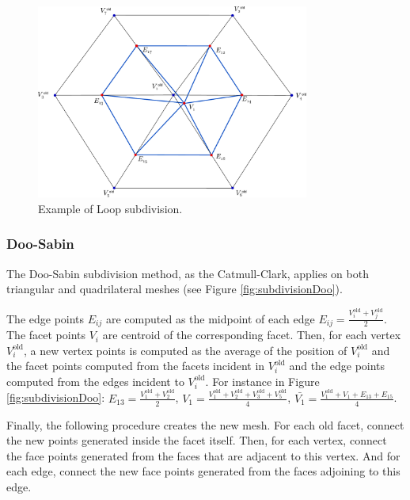 \begin{figure}
\begin{center}
\centering
  \includegraphics[width=0.8\textwidth]{./img/subdivisionLoop}
 \caption{Example of Loop subdivision.}
 \label{fig:subdivisionLoop}
\end{center}
\end{figure}

\subsubsection{Doo-Sabin}

The Doo-Sabin subdivision method, as the Catmull-Clark, applies on both triangular and quadrilateral meshes (see Figure \ref{fig:subdivisionDoo}).

The edge points $E_{ij}$ are computed as the midpoint of each edge $E_{ij} = \frac{V_i^{\text{old}} + V_j^{\text{old}}}{2}$. 
The facet points $V_i$ are centroid of the corresponding facet. 
Then, for each vertex $V_i^{\text{old}}$, a new vertex points is computed as the average of the position of $V_i^{\text{old}}$ and the facet points computed from the facets incident in $V_i^{\text{old}}$ and the edge points computed from the edges incident to $V_i^{\text{old}}$. 
For instance in Figure \ref{fig:subdivisionDoo}:
$
E_{13} = \frac{V_1^{\text{old}} + V_2^{\text{old}}}{2}
$, 
$
V_1 = \frac{V_1^{\text{old}} + V_2^{\text{old}} + V_3^{\text{old}} + V_5^{\text{old}}}{4}
$, 
$
\bar{V_1} = \frac{V_1^{\text{old}}  + V_1 + E_{13} + E_{15}}{4}
$.

Finally, the following procedure creates the new mesh. 
For each old facet, connect the new points generated inside the facet itself.
Then, for each vertex, connect the face points generated from the faces that are adjacent to this vertex. 
And for each edge, connect the new face points generated from the faces adjoining to this edge. 




